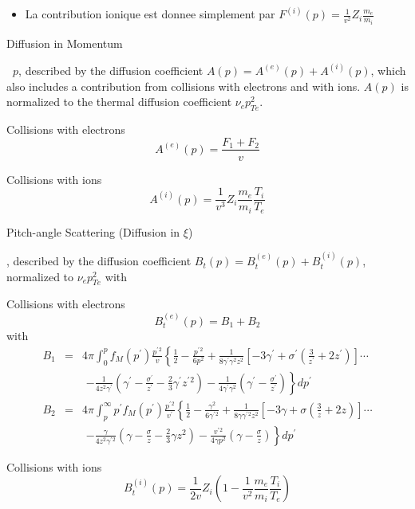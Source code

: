 \begin{itemize}
\item  
La contribution ionique est donnee simplement par $F^{(i)}(p)=\frac{1}{v^{2}}
Z_{i}\frac{m_{e}}{m_{i}}$
\end{itemize}

Diffusion in Momentum

\textbf{\ $p$}, described by the diffusion coefficient $
A(p)=A^{(e)}(p)+A^{(i)}(p)$, which also includes a contribution from
collisions with electrons and with ions. $A(p)$ is normalized to the thermal
diffusion coefficient $\nu _{e}p_{Te}^{2}$.

Collisions with electrons 
\[
A^{(e)}(p)=\frac{F_{1}+F_{2}}{v}
\]

Collisions with ions 
\[
A^{(i)}(p)=\frac{1}{v^{3}}Z_{i}\frac{m_{e}}{m_{i}}\frac{T_{i}}{T_{e}}
\]

Pitch-angle Scattering (Diffusion in $\xi $)

, described by the diffusion coefficient $%
B_{t}(p)=B_{t}^{(e)}(p)+B_{t}^{(i)}(p)$, normalized to $\nu _{e}p_{Te}^{2}$
with

Collisions with electrons 
\[
B_{t}^{(e)}(p)=B_{1}+B_{2}
\]
with 
\begin{eqnarray*}
B_{1} &=&4\pi \int_{0}^{p}f_{M}(p^{\prime })\frac{p^{\prime }{}^{2}}{v}
\left\{ \frac{1}{2}-\frac{p^{\prime }{}^{2}}{6p^{2}}+\frac{1}{8\gamma
^{\prime }\gamma ^{2}z^{2}}\left[ -3\gamma ^{\prime }+\sigma ^{\prime
}\left( \frac{3}{z^{\prime }}+2z^{\prime }\right) \right] \cdots \right.  \\
&&\,\,\left. -\frac{1}{4z^{2}\gamma ^{\prime }}\left( \gamma ^{\prime }-%
\frac{\sigma ^{\prime }}{z^{\prime }}-\frac{2}{3}\gamma ^{\prime }z^{\prime
}{}^{2}\right) -\frac{1}{4\gamma ^{\prime }\gamma ^{2}}\left( \gamma
^{\prime }-\frac{\sigma ^{\prime }}{z^{\prime }}\right) \right\} dp^{\prime }
\\
B_{2} &=&4\pi \int_{p}^{\infty }p^{\prime }f_{M}(p^{\prime })\frac{p^{\prime
}{}^{2}}{v^{\prime }}\left\{ \frac{1}{2}-\frac{\gamma ^{2}}{6\gamma ^{\prime
}{}^{2}}+\frac{1}{8\gamma \gamma ^{\prime }{}^{2}z^{2}}\left[ -3\gamma
+\sigma \left( \frac{3}{z}+2z\right) \right] \cdots \right.  \\
&&\,\,\left. -\frac{\gamma }{4z^{2}\gamma ^{\prime }{}^{2}}\left( \gamma -%
\frac{\sigma }{z}-\frac{2}{3}\gamma z^{2}\right) -\frac{v^{\prime }{}^{2}}{
4\gamma p^{2}}\left( \gamma -\frac{\sigma }{z}\right) \right\} dp^{\prime }
\end{eqnarray*}

Collisions with ions 
\[
B_{t}^{(i)}(p)=\frac{1}{2v}Z_{i}\left( 1-\frac{1}{v^{2}}\frac{m_{e}}{m_{i}}%
\frac{T_{i}}{T_{e}}\right) 
\]

